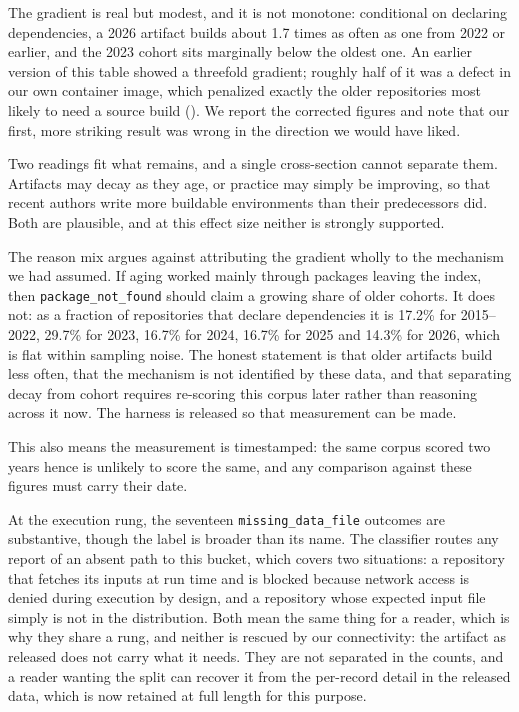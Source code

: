 The gradient is real but modest, and it is not monotone: conditional on declaring
dependencies, a 2026 artifact builds about 1.7 times as often as one from 2022 or
earlier, and the 2023 cohort sits marginally below the oldest one. An earlier
version of this table showed a threefold gradient; roughly half of it was a
defect in our own container image, which penalized exactly the older repositories
most likely to need a source build (). We report the
corrected figures and note that our first, more striking result was wrong in the
direction we would have liked.

Two readings fit what remains, and a single cross-section cannot separate them.
Artifacts may decay as they age, or practice may simply be improving, so that
recent authors write more buildable environments than their predecessors did.
Both are plausible, and at this effect size neither is strongly supported.

The reason mix argues against attributing the gradient wholly to the mechanism we
had assumed. If aging worked mainly through packages leaving the index, then
\texttt{package\_not\_found} should claim a growing share of older cohorts. It
does not: as a fraction of repositories that declare dependencies it is 17.2\%
for 2015--2022, 29.7\% for 2023, 16.7\% for 2024, 16.7\% for 2025 and 14.3\% for
2026, which is flat within sampling noise. The honest statement is that older
artifacts build less often, that the mechanism is not identified by these data,
and that separating decay from cohort requires re-scoring this corpus later
rather than reasoning across it now. The harness is released so that measurement
can be made.

This also means the measurement is timestamped: the same corpus scored two years
hence is unlikely to score the same, and any comparison against these figures
must carry their date.

At the execution rung, the seventeen \texttt{missing\_data\_file} outcomes are
substantive, though the label is broader than its name. The classifier routes any
report of an absent path to this bucket, which covers two situations: a
repository that fetches its inputs at run time and is blocked because network
access is denied during execution by design, and a repository whose expected
input file simply is not in the distribution. Both mean the same thing for a
reader, which is why they share a rung, and neither is rescued by our
connectivity: the artifact as released does not carry what it needs. They are not
separated in the counts, and a reader wanting the split can recover it from the
per-record detail in the released data, which is now retained at full length for
this purpose.

